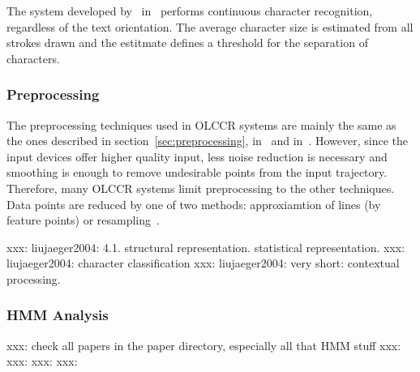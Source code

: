 The system developed by~ in~
performs continuous character recognition, regardless of the text orientation.
The average character size is estimated from all strokes drawn and the estitmate
defines a threshold for the separation of characters.

\subsubsection{Preprocessing}
\label{sec:olccrpreprocessing}

The preprocessing techniques used in OLCCR systems are mainly the same as the
ones described in section~\ref{sec:preprocessing}, in~
and in~. However, since the input devices offer higher 
quality input, less noise reduction is necessary and smoothing is enough to 
remove undesirable points from the input trajectory. Therefore, many OLCCR 
systems limit preprocessing to the other techniques. Data points are reduced
by one of two methods: approxiamtion of lines (by feature points) or 
resampling~.


xxx: liujaeger2004: 4.1. structural representation. statistical representation.
xxx: liujaeger2004: character classification
xxx: liujaeger2004: very short: contextual processing.


\subsubsection{HMM Analysis}
\label{sec:hmmanalysis}
xxx: check all papers in the paper directory, especially all that HMM stuff
xxx: 
xxx: 
xxx: 
xxx: 
